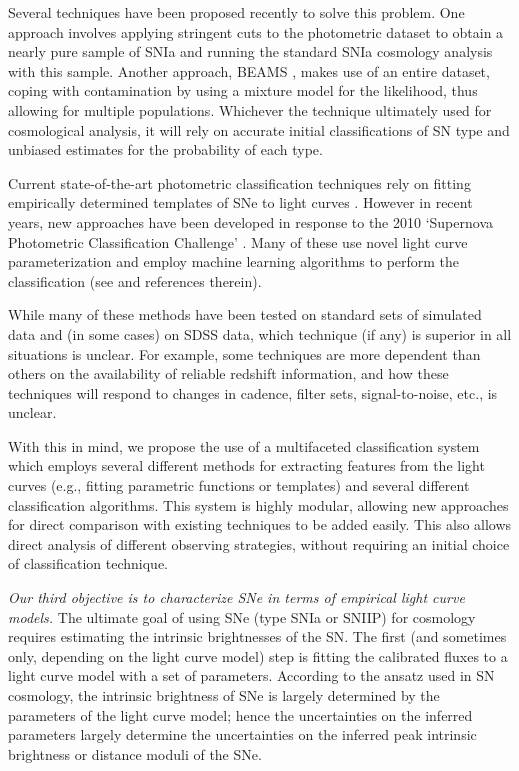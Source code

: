 Several techniques have been proposed recently to solve this problem. One
approach involves applying stringent cuts to the photometric dataset to obtain a nearly pure sample
of SNIa \citep{Bernstein2012,Campbell2013} and running the standard SNIa cosmology analysis
with this sample. Another approach, BEAMS \citep{Kunz2007,Newling2011,Hlozek2012,Knights2013},
makes use of an entire dataset, coping with contamination by using a mixture model for the
likelihood, thus allowing for multiple populations. Whichever the technique ultimately used for
cosmological analysis, it will rely on accurate initial classifications of SN type and
unbiased estimates for the probability of each type.

Current state-of-the-art photometric classification techniques rely on
fitting empirically determined templates of SNe to light curves
\citep{Jha2007,Guy2007,Sako2011}. However in recent years, new approaches
have been developed in response to the 2010 `Supernova Photometric
Classification Challenge' \citep{Kessler2010a}. Many of these use novel
light curve parameterization and employ machine learning algorithms to
perform the classification (see \citet{Kessler2010b} and references
therein).

While many of these methods have been tested on standard sets of simulated data and (in some cases)
on SDSS data, which technique (if any) is superior in all situations is unclear. For
example, some techniques are more dependent than others on the availability of reliable redshift information, and how
these techniques will respond to changes in cadence, filter sets, signal-to-noise,
etc., is unclear.

With this in mind, we propose the use of a multifaceted classification system which
employs several different methods for extracting features from the light curves (e.g.,
fitting parametric functions or templates) and several different classification
algorithms. This system is highly modular, allowing new approaches for direct comparison
with existing  techniques to be added easily. This also allows direct analysis of
different observing strategies, without requiring an initial choice of classification
technique.


{\emph{Our third objective is to characterize SNe in terms of empirical
light curve models.}} The ultimate goal of using SNe (type SNIa or
SNIIP) for cosmology requires estimating the intrinsic brightnesses of
the SN. The first (and sometimes only, depending on the light curve
model) step is fitting the calibrated fluxes to a light curve model with
a set of parameters. According to the ansatz used in SN cosmology, the
intrinsic brightness of SNe is largely determined by the parameters of
the light curve model; hence the uncertainties on the inferred
parameters largely determine the uncertainties on the inferred peak
intrinsic brightness or distance moduli of the SNe.


